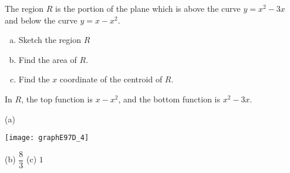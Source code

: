 
\begin{Mquestion}[1997D]
 The region $R$ is the portion of the plane which is above
the curve $y=x^2-3x$ and below the curve $y=x-x^2$.
\begin{enumerate}[(a)]
\item
Sketch the region $R$
\item
Find the area of $R$.
\item
Find the $x$ coordinate of the centroid of $R$.
\end{enumerate}
\end{Mquestion}
\begin{hint}
In $R$, the top function is $x-x^2$, and the bottom function is $x^2-3x$.
\end{hint}
\begin{answer} (a)
\begin{center}
       \texttt{[image: graphE97D\_4]}
\end{center}

\noindent  (b)
$\dfrac{8}{3}$
\qquad  (c)
$1$
\end{answer}

